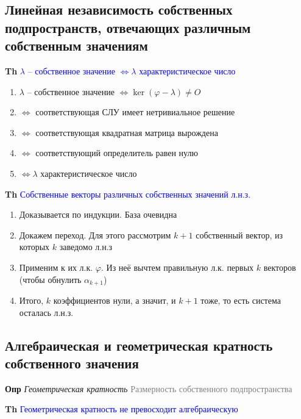     \subsection{Линейная независимость собственных подпространств, отвечающих различным собственным значениям}

    \textbf{Th} \textcolor{blue}{$\lambda$ -- собственное значение $\Leftrightarrow \lambda$ характеристическое число}

    \begin{enumerate}
        \item $\lambda$ -- собственное значение $\Leftrightarrow \ker (\varphi - \lambda) \neq O$
        \item $\Leftrightarrow$ соответствующая СЛУ имеет нетривиальное решение
        \item $\Leftrightarrow$ соответствующая квадратная матрица вырождена
        \item $\Leftrightarrow$ соответствующий определитель равен нулю
        \item $\Leftrightarrow \lambda$ характеристическое число
    \end{enumerate}

    \textbf{Th} \textcolor{blue}{Собственные векторы различных собственных значений л.н.з.}

    \begin{enumerate}
        \item Доказывается по индукции.
        База очевидна
        \item Докажем переход.
        Для этого рассмотрим $k+1$ собственный вектор, из которых $k$ заведомо л.н.з
        \item Применим к их л.к. $\varphi$.
        Из неё вычтем правильную л.к. первых $k$ векторов (чтобы обнулить $\alpha_{k+1}$)
        \item Итого, $k$ коэффициентов нули, а значит, и $k+1$ тоже, то есть система осталась л.н.з.
    \end{enumerate}

    \subsection{Алгебраическая и геометрическая кратность собственного значения}

    \textbf{Опр} \textit{Геометрическая кратность} \textcolor{gray}{Размерность собственного подпространства}

    \textbf{Th} \textcolor{blue}{Геометрическая кратность не превосходит алгебраическую}

